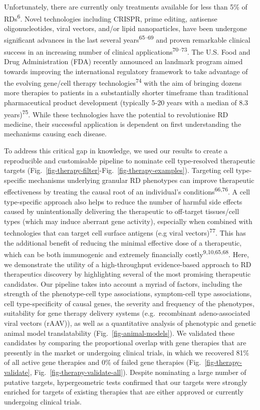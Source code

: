 \documentclass[
]{article}
\begin{document}
Unfortunately, there are currently only treatments available for less
than 5\% of RDs\textsuperscript{6}. Novel technologies including CRISPR,
prime editing, antisense oligonucleotides, viral vectors, and/or lipid
nanoparticles, have been undergone significant advances in the last
several years\textsuperscript{65--69} and proven remarkable clinical
success in an increasing number of clinical
applications\textsuperscript{70--73}. The U.S. Food and Drug
Administration (FDA) recently announced an landmark program aimed
towards improving the international regulatory framework to take
advantage of the evolving gene/cell therapy
technologies\textsuperscript{74} with the aim of bringing dozens more
therapies to patients in a substantially shorter timeframe than
traditional pharmaceutical product development (typically 5-20 years
with a median of 8.3 years)\textsuperscript{75}. While these
technologies have the potential to revolutionise RD medicine, their
successful application is dependent on first understanding the
mechanisms causing each disease.

To address this critical gap in knowledge, we used our results to create
a reproducible and customisable pipeline to nominate cell type-resolved
therapeutic targets
(Fig.~\ref{fig-therapy-filter}-Fig.~\ref{fig-therapy-examples}).
Targeting cell type-specific mechanisms underlying granular RD
phenotypes can improve therapeutic effectiveness by treating the causal
root of an individual's conditions\textsuperscript{66,76}. A cell
type-specific approach also helps to reduce the number of harmful side
effects caused by unintentionally delivering the therapeutic to
off-target tissues/cell types (which may induce aberrant gene activity),
especially when combined with technologies that can target cell surface
antigens (e.g viral vectors)\textsuperscript{77}. This has the
additional benefit of reducing the minimal effective dose of a
therapeutic, which can be both immunogenic and extremely financially
costly\textsuperscript{9,10,65,68}. Here, we demonstrate the utility of
a high-throughput evidence-based approach to RD therapeutics discovery
by highlighting several of the most promising therapeutic candidates.
Our pipeline takes into account a myriad of factors, including the
strength of the phenotype-cell type associations, symptom-cell type
associations, cell type-specificity of causal genes, the severity and
frequency of the phenotypes, suitability for gene therapy delivery
systems (e.g.~recombinant adeno-associated viral vectors (rAAV)), as
well as a quantitative analysis of phenotypic and genetic animal model
translatability (Fig.~\ref{fig-animal-models}). We validated these
candidates by comparing the proportional overlap with gene therapies
that are presently in the market or undergoing clinical trials, in which
we recovered 81\% of all active gene therapies and 0\% of failed gene
therapies (Fig.~\ref{fig-therapy-validate},
Fig.~\ref{fig-therapy-validate-all}). Despite nominating a large number
of putative targets, hypergeometric tests confirmed that our targets
were strongly enriched for targets of existing therapies that are either
approved or currently undergoing clinical trials.
\end{document}
